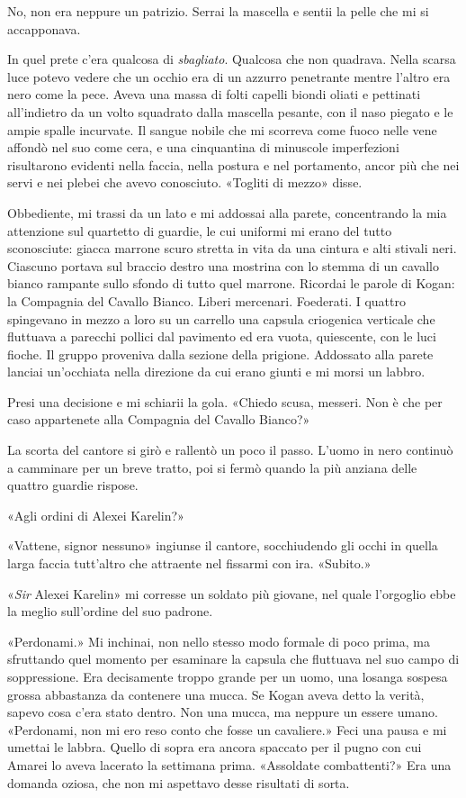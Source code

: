 No, non era neppure un patrizio. Serrai la mascella e sentii la pelle
che mi si accapponava.

In quel prete c'era qualcosa di \emph{sbagliato}. Qualcosa che non
quadrava. Nella scarsa luce potevo vedere che un occhio era di un
azzurro penetrante mentre l'altro era nero come la pece. Aveva una massa
di folti capelli biondi oliati e pettinati all'indietro da un volto
squadrato dalla mascella pesante, con il naso piegato e le ampie spalle
incurvate. Il sangue nobile che mi scorreva come fuoco nelle vene
affondò nel suo come cera, e una cinquantina di minuscole imperfezioni
risultarono evidenti nella faccia, nella postura e nel portamento, ancor
più che nei servi e nei plebei che avevo conosciuto. «Togliti di mezzo»
disse.

Obbediente, mi trassi da un lato e mi addossai alla parete, concentrando
la mia attenzione sul quartetto di guardie, le cui uniformi mi erano del
tutto sconosciute: giacca marrone scuro stretta in vita da una cintura e
alti stivali neri. Ciascuno portava sul braccio destro una mostrina con
lo stemma di un cavallo bianco rampante sullo sfondo di tutto quel
marrone. Ricordai le parole di Kogan: la Compagnia del Cavallo Bianco.
Liberi mercenari. Foederati. I quattro spingevano in mezzo a loro su un
carrello una capsula criogenica verticale che fluttuava a parecchi
pollici dal pavimento ed era vuota, quiescente, con le luci fioche. Il
gruppo proveniva dalla sezione della prigione. Addossato alla parete
lanciai un'occhiata nella direzione da cui erano giunti e mi morsi un
labbro.

Presi una decisione e mi schiarii la gola. «Chiedo scusa, messeri. Non è
che per caso appartenete alla Compagnia del Cavallo Bianco?»

La scorta del cantore si girò e rallentò un poco il passo. L'uomo in
nero continuò a camminare per un breve tratto, poi si fermò quando la
più anziana delle quattro guardie rispose.

«Agli ordini di Alexei Karelin?»

«Vattene, signor nessuno» ingiunse il cantore, socchiudendo gli occhi in
quella larga faccia tutt'altro che attraente nel fissarmi con ira.
«Subito.»

«\emph{Sir} Alexei Karelin» mi corresse un soldato più giovane, nel
quale l'orgoglio ebbe la meglio sull'ordine del suo padrone.

«Perdonami.» Mi inchinai, non nello stesso modo formale di poco prima,
ma sfruttando quel momento per esaminare la capsula che fluttuava nel
suo campo di soppressione. Era decisamente troppo grande per un uomo,
una losanga sospesa grossa abbastanza da contenere una mucca. Se Kogan
aveva detto la verità, sapevo cosa c'era stato dentro. Non una mucca, ma
neppure un essere umano. «Perdonami, non mi ero reso conto che fosse un
cavaliere.» Feci una pausa e mi umettai le labbra. Quello di sopra era
ancora spaccato per il pugno con cui Amarei lo aveva lacerato la
settimana prima. «Assoldate combattenti?» Era una domanda oziosa, che
non mi aspettavo desse risultati di sorta.

